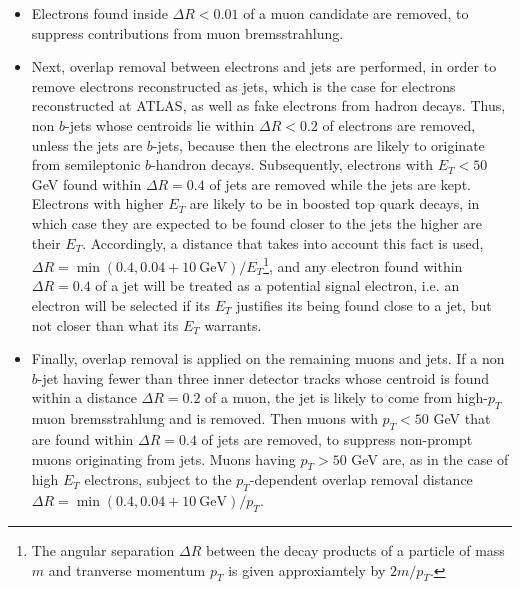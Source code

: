 \begin{itemize}

	\item Electrons found inside $\Delta R < 0.01$ of a muon candidate are removed,
	      to suppress contributions from muon bremsstrahlung.

\item Next, overlap removal between electrons and jets are performed, in order
to remove electrons reconstructed as jets, which is the case for electrons
reconstructed at ATLAS, as well as fake electrons from hadron decays. Thus, non
$b$-jets whose centroids lie within $\Delta R < 0.2$ of electrons are removed,
unless the jets are $b$-jets, because then the electrons are likely to
originate from semileptonic $b$-handron decays. Subsequently, electrons with
$E_T < 50$ GeV found within $\Delta R = 0.4$ of jets are removed while the jets
are kept. Electrons with higher $E_T$ are likely to be in boosted top quark
decays, in which case they are expected to be found closer to the jets the
higher are their $E_T$. Accordingly, a distance that takes into account this
fact is used, $\Delta R = \min(0.4, 0.04+10~\text{GeV}) / E_T$\footnote{The
angular separation $\Delta R$ between the decay products of a particle of mass
$m$ and tranverse momentum $p_T$ is given approxiamtely by $2m/p_T$.}, and any
electron found within $\Delta R = 0.4$ of a jet will be treated as a potential
signal electron, i.e. an electron will be selected if its $E_T$ justifies its
being found close to a jet, but not closer than what its $E_T$ warrants.

	\item Finally, overlap removal is applied on the remaining muons and jets. If a
	      non $b$-jet having fewer than three inner detector tracks whose centroid is
	      found within a distance $\Delta R = 0.2$ of a muon, the jet is likely to come
	      from high-$p_T$ muon bremsstrahlung and is removed. Then muons with $p_T < 50$
	      GeV that are found within $\Delta R = 0.4$ of jets are removed, to suppress
	      non-prompt muons originating from jets. Muons having $p_T > 50$ GeV are, as in
	      the case of high $E_T$ electrons, subject to the $p_T$-dependent overlap
	      removal distance $\Delta R = \min(0.4, 0.04+10~\text{GeV}) / p_T$.

\end{itemize}


